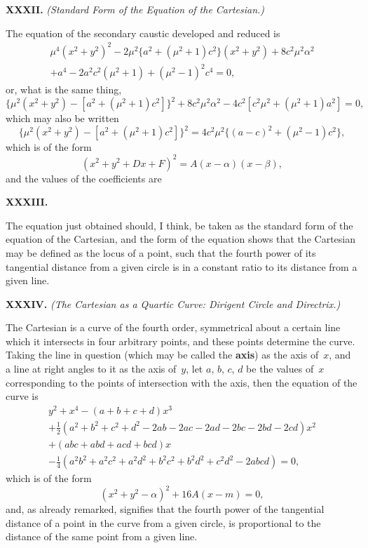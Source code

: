 \documentclass[12pt,a4paper]{article}
\theoremstyle{definition}
\begin{document}
\medskip\noindent\textbf{XXXII.}
\textit{(Standard Form of the Equation of the Cartesian.)}

The equation of the secondary caustic developed and reduced is
\begin{multline*}
\mu^{4} (x^{2} + y^{2})^{2}
- 2\mu^{2} \{ a^{2} + (\mu^{2} + 1)c^{2} \} (x^{2} + y^{2})
+ 8c^{2}\mu^{2}\alpha^{2} \\
+ a^{4} - 2a^{2}c^{2}(\mu^{2} + 1) + (\mu^{2} - 1)^{2} c^{4} = 0,
\end{multline*}
or, what is the same thing,
\[
\{ \mu^{2} (x^{2} + y^{2}) - [a^{2} + (\mu^{2} + 1)c^{2}] \}^{2}
+ 8c^{2}\mu^{2}\alpha^{2} - 4c^{2} [ c^{2}\mu^{2} + (\mu^{2} + 1) a^{2} ] = 0,
\]
which may also be written
\[
\{ \mu^{2} (x^{2} + y^{2}) - [a^{2} + (\mu^{2} + 1)c^{2}] \}^{2}
= 4c^{2}\mu^{2} \{ (a - c)^{2} + (\mu^{2} - 1)c^{2} \},
\]
which is of the form
\[
(x^{2} + y^{2} + Dx + F)^{2} = A(x - \alpha)(x - \beta),
\]
and the values of the coefficients are

\medskip\noindent\textbf{XXXIII.}

The equation just obtained should, I think, be taken as the
standard form of the equation of the Cartesian, and the form
of the equation shows that the Cartesian may be defined as
the locus of a point, such that the fourth power of its tangential
distance from a given circle is in a constant ratio to its distance
from a given line.

\medskip\noindent\textbf{XXXIV.}
\textit{(The Cartesian as a Quartic Curve: Dirigent Circle and Directrix.)}

The Cartesian is a curve of the fourth order, symmetrical
about a certain line which it intersects in four arbitrary points,
and these points determine the curve.
Taking the line in question (which may be called the \textbf{axis})
as the axis of~$x$, and a line at right angles to it as the axis of~$y$,
let $a$, $b$, $c$, $d$ be the values of~$x$ corresponding to the points
of intersection with the axis, then the equation of the curve is
\begin{multline*}
y^{2} + x^{4} - (a + b + c + d)x^{3} \\
+ \tfrac{1}{2}(a^{2} + b^{2} + c^{2} + d^{2} - 2ab - 2ac - 2ad - 2bc - 2bd - 2cd)x^{2} \\
+ (abc + abd + acd + bcd)x \\
- \tfrac{1}{4}(a^{2}b^{2} + a^{2}c^{2} + a^{2}d^{2} + b^{2}c^{2} + b^{2}d^{2} + c^{2}d^{2}
- 2abcd) = 0,
\end{multline*}
which is of the form
\[
(x^{2} + y^{2} - \alpha)^{2} + 16A(x - m) = 0,
\]
and, as already remarked, signifies that the fourth power of
the tangential distance of a point in the curve from a given circle,
is proportional to the distance of the same point from a given line.
\end{document}
